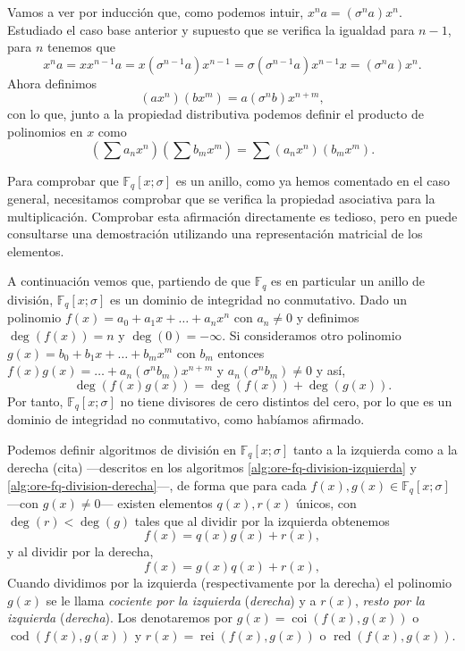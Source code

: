 Vamos a ver por inducción que, como podemos intuir, \(x^n a = (\sigma^n a)x^n\). 
Estudiado el caso base anterior y supuesto que se verifica la igualdad para \(n - 1\), para \(n\) tenemos que
\[
  x^{n}a = xx^{n - 1}a = x(\sigma^{n-1} a)x^{n-1} = \sigma(\sigma^{n-1} a)x^{n-1}x = (\sigma^{n}a)x^{n}.
\]
Ahora definimos
\[
  (ax^n)(bx^m) = a(\sigma^n b)x^{n+m},
\]
con lo que, junto a la propiedad distributiva podemos definir el producto de polinomios en \(x\) como
\[
  \textstyle(\sum a_nx^n)(\sum b_mx^m) = \sum(a_nx^n)(b_mx^m).
\]

Para comprobar que \(\mathbb F_q[x; \sigma]\) es un anillo, como ya hemos comentado en el caso general, necesitamos comprobar que se verifica la propiedad asociativa para la multiplicación.
Comprobar esta afirmación directamente es tedioso, pero en \parencite[p. 2-3]{jacobson_finite-dimensional_1996} puede consultarse una demostración utilizando una representación matricial de los elementos.

A continuación vemos que, partiendo de que \(\mathbb F_q\) es en particular un anillo de división, \(\mathbb F_q[x; \sigma]\) es un dominio de integridad no conmutativo.
Dado un polinomio \(f(x) = a_0 + a_1x + \dots + a_nx^n\) con \(a_n \neq 0\) y definimos \(\deg(f(x)) = n\) y \(\deg(0) = -\infty\).
Si consideramos otro polinomio \(g(x) = b_0 + b_1x + \dots + b_mx^m\) con \(b_m\) entonces \(f(x)g(x) = \dots + a_n(\sigma^n b_m)x^{n+m}\) y \(a_n(\sigma^nb_m) \neq 0\) y así,
\[
  \deg(f(x)g(x)) = \deg(f(x)) + \deg(g(x)).
\]
Por tanto, \(\mathbb F_q[x; \sigma]\) no tiene divisores de cero distintos del cero, por lo que es un dominio de integridad no conmutativo, como habíamos afirmado.

Podemos definir algoritmos de división en \(\mathbb F_q[x; \sigma]\) tanto a la izquierda como a la derecha (cita)  —descritos en los algoritmos \ref{alg:ore-fq-division-izquierda} y \ref{alg:ore-fq-division-derecha}—, de forma que para cada \(f(x), g(x) \in \mathbb F_q[x; \sigma]\) —con \(g(x) \neq 0\)— existen elementos \(q(x), r(x)\) únicos, con \(\deg(r) < \deg(g)\) tales que al dividir por la izquierda obtenemos
\[
  f(x) = q(x)g(x) + r(x),
\]
y al dividir por la derecha, 
\[
  f(x) = g(x)q(x) + r(x),
\]
Cuando dividimos por la izquierda (respectivamente por la derecha) el polinomio \(g(x)\) se le llama \textit{cociente por la izquierda} (\textit{derecha}) y a \(r(x)\), \textit{resto por la izquierda} (\textit{derecha}).
Los denotaremos por \(g(x) = \operatorname{coi}(f(x), g(x))\) o \(\operatorname{cod}(f(x), g(x))\) y \(r(x) = \operatorname{rei}(f(x), g(x))\) o \(\operatorname{red}(f(x), g(x))\).

